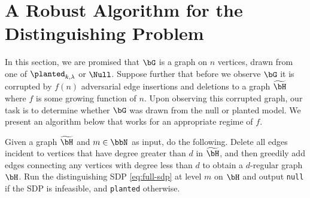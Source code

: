 \section{A Robust Algorithm for the Distinguishing Problem} \label{sec:robust}

In this section, we are promised that $\bG$ is a graph on $n$ vertices, drawn from one of $\planted_{k,\lambda}$ or $\Null$. Suppose further that before we observe $\bG$ it is corrupted by $f(n)$ adversarial edge insertions and deletions to a graph $\widetilde{\bH}$ where $f$ is some growing function of $n$. Upon observing this corrupted graph, our task is to determine whether $\bG$ was drawn from the null or planted model.  We present an algorithm below that works for an appropriate regime of $f$. 

\begin{algorithm}	\label{alg:robust}
	Given a graph $\widetilde{\bH}$ and $m \in \bbN$ as input, do the following.  Delete all edges incident to vertices that have degree greater than $d$ in $\widetilde{\bH}$, and then greedily add edges connecting any vertices with degree less than $d$ to obtain a $d$-regular graph $\bH$. Run the distinguishing SDP \eqref{eq:full-sdp} at level $m$ on $\bH$ and output \texttt{null} if the SDP is infeasible, and \texttt{planted} otherwise.
\end{algorithm}


